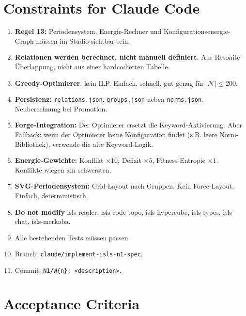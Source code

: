 \documentclass[11pt,a4paper]{article}
\begin{document}
\section{Constraints for Claude Code}

\begin{enumerate}
\item \textbf{Regel 13:} Periodensystem, Energie-Rechner und Konfigurationsenergie-Graph m\"ussen im Studio sichtbar sein.
\item \textbf{Relationen werden berechnet, nicht manuell definiert.} Aus Resonite-\"Uberlappung, nicht aus einer hardcodierten Tabelle.
\item \textbf{Greedy-Optimierer}, kein ILP. Einfach, schnell, gut genug f\"ur $|\mathcal{N}| \leq 200$.
\item \textbf{Persistenz:} \texttt{relations.json}, \texttt{groups.json} neben \texttt{norms.json}. Neuberechnung bei Promotion.
\item \textbf{Forge-Integration:} Der Optimierer ersetzt die Keyword-Aktivierung. Aber Fallback: wenn der Optimierer keine Konfiguration findet (z.B. leere Norm-Bibliothek), verwende die alte Keyword-Logik.
\item \textbf{Energie-Gewichte:} Konflikt $\times 10$, Defizit $\times 5$, Fitness-Entropie $\times 1$. Konflikte wiegen am schwersten.
\item \textbf{SVG-Periodensystem:} Grid-Layout nach Gruppen. Kein Force-Layout. Einfach, deterministisch.
\item \textbf{Do not modify} isls-reader, isls-code-topo, isls-hypercube, isls-types, isls-chat, isls-merkaba.
\item Alle bestehenden Tests m\"ussen passen.
\item Branch: \texttt{claude/implement-isls-n1-spec}.
\item Commit: \texttt{N1/W\{n\}: <description>}.
\end{enumerate}

\section{Acceptance Criteria}
\end{document}
